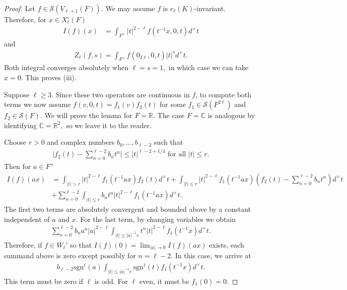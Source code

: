 \documentclass[11pt,a4paper,reqno]{amsart}
\theoremstyle{remark}
\numberwithin{equation}{section}
\newcommand{\CC}{\mathbb{C}}
\newcommand{\RR}{\mathbb{R}}
\theoremstyle{definition}
\numberwithin{equation}{section}
\begin{document}
\begin{proof}
    Let $f\in \mathcal{S}(V_{\ell+1}(F)).$ We may assume $f$ is $r_\ell(K)$-invariant. Therefore, for $x\in X_\ell^\circ(F)$
    \begin{align*}
        I(f)(x)&=\int_{F^\times} |t|^{2-\ell} f(t^{-1}x,0,t)d^\times t
    \end{align*}
    and 
    \begin{align*}
        Z_\ell(f,s)=\int_{F^\times} f(0_{\underline{2\ell}},0,t)|t|^sd^\times t.
    \end{align*}
    Both integral converges absolutely when $\ell=s=1,$ in which case we can take $x=0$. This proves (iii).
    
   Suppose $\ell\ge 3$. Since these two operators are continuous in $f$, to compute both terms we now assume $f(v,0,t)=f_1(v)f_2(t)$ for some $f_1\in \mathcal{S}(F^{2\ell})$ and  $f_2\in \mathcal{S}(F)$.  We will prove the lemma for $F=\RR.$ The case $F=\CC$ is analogous by identifying $\CC=\RR^2,$ so we leave it to the reader. 
   
    Choose $r>0$ and complex numbers $b_0,\ldots, b_{\ell-2}$ such that 
   \begin{align*}
       \bigg|f_2(t)-\sum_{n=0}^{\ell-2}b_nt^n\bigg|\le |t|^{\ell-2+1/4} \textrm{ for all } |t|\le r. 
   \end{align*}
   Then for $a\in F^\times$
   \begin{align*}
       I(f)(ax)&=\int_{|t|>r} |t|^{2-\ell}f_1(t^{-1}ax)f_2(t) d^\times t+\int_{|t|\le r} |t|^{2-\ell}f_1(t^{-1}ax)\left(f_2(t)-\sum_{n=0}^{\ell-2} b_nt^n\right) d^\times t\\
       &+\sum_{n=0}^{\ell-2}\int_{|t|\le r} b_nt^n|t|^{2-\ell} f_1(t^{-1}ax)d^\times t.
   \end{align*}
   The first two terms are absolutely convergent and bounded above by a constant independent of $a$ and $x$. For the last term, by changing variables we obtain
   \begin{align*}
       \sum_{n=0}^{\ell-2} b_n a^n|a|^{2-\ell}\int_{|t|\le |a|^{-1}r}t^n|t|^{2-\ell} f_1(t^{-1}x)d^\times t.
   \end{align*}
    Therefore, if $f\in W_\ell'$ so that $I(f)(0)=\lim_{|a|\to 0}I(f)(ax)$ exists, each summand above is zero except possibly for $n=\ell-2$. In this case, we arrive at
    \begin{align*}
        b_{\ell-2}\mathrm{sgn}^{\ell}(a)\int_{|t|\le |a|^{-1}r} \mathrm{sgn}^\ell(t)f_1(t^{-1} x)d^\times  t.
    \end{align*}
    This term must be zero if $\ell$ is odd. For $\ell$ even, it must be $f_1(0)=0.$ 
    

\end{proof}
\end{document}
